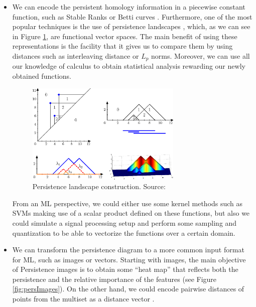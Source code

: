 \documentclass[../main.tex]{subfiles}
\begin{document}
\begin{itemize}
    \item We can encode the persistent homology information in a piecewise constant function, such as Stable Ranks \cite{agerberg_supervised_2021} or Betti curves \cite{hensel_survey_2021}. Furthermore, one of the most popular techniques is the use of persistence landscapes \cite{bubenik_statistical_2015}, which, as we can see in Figure \ref{fig:landscapes}, are functional vector spaces. The main benefit of using these representations is the facility that it gives us to compare them by using distances such as interleaving distance or $L_p$ norms. Moreover, we can use all our knowledge of calculus to obtain statistical analysis rewarding our newly obtained functions. 

    \begin{figure}[!ht]
        \centering
        \includegraphics[width=0.7\textwidth]{figures/bg/landscapes.png} 
        \caption{Persistence landscape construction. Source: \cite{bubenik_statistical_2015}}
        \label{fig:landscapes}
    \end{figure}

    From an ML perspective, we could either use some kernel methods such as SVMs making use of a scalar product defined on these functions, but also we could simulate a signal processing setup and perform some sampling and quantization to be able to vectorize the functions over a certain domain.

    \item We can transform the persistence diagram to a more common input format for ML, such as images or vectors. Starting with images, the main objective of Persistence images \cite{adams_persistence_2016} is to obtain some ``heat map'' that reflects both the persistence and the relative importance of the features (see Figure \ref{fig:persImages}). On the other hand, we could encode pairwise distances of points from the multiset as a distance vector \cite{carriere_stable_2015}.


\end{itemize}
\end{document}
